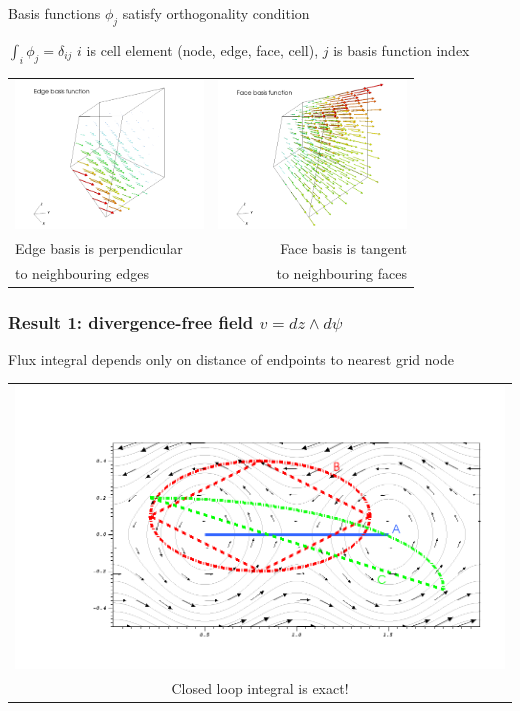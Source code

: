 \documentclass[aspectratio=169]{beamer}
\begin{document}
\begin{frame}[fragile]{Basis functions $\phi_j$ satisfy orthogonality condition}

\begin{block}{$\int_i \phi_j = \delta_{ij}$}
   $i$ is cell element (node, edge, face, cell), $j$ is basis function index
 \end{block}
  \begin{tabular}{lr}
      \includegraphics[width=50mm]{hexEdge.png} &                        \includegraphics[width=50mm]{hexFace.png} \\
      {Edge basis is perpendicular } & {Face basis is tangent }  \\
      {to neighbouring edges} & {to neighbouring faces}
\end{tabular}

\end{frame}

\begin{frame}[t]
  \frametitle{Result 1: divergence-free field  $v = dz \wedge d\psi$}
  \begin{block}{Flux integral depends only on distance of endpoints to nearest grid node}
  \end{block}
  \begin{tabular}{c}
    \includegraphics[width=.7\linewidth]{flow.png} \\
    Closed loop integral is exact!
  \end{tabular}
\end{frame}
\end{document}
